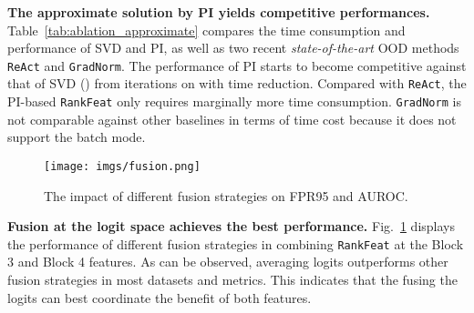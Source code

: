 \noindent \textbf{The approximate solution by PI yields competitive performances.} Table~\ref{tab:ablation_approximate} compares the time consumption and performance of SVD and PI, as well as two recent \emph{state-of-the-art} OOD methods \texttt{ReAct} and \texttt{GradNorm}. The performance of PI starts to become competitive against that of SVD () from  iterations on with  time reduction. Compared with \texttt{ReAct}, the PI-based \texttt{RankFeat} only requires marginally  more time consumption. \texttt{GradNorm} is not comparable against other baselines in terms of time cost because it does not support the batch mode.


\begin{figure}[htbp]
    \centering
    \texttt{[image: imgs/fusion.png]}
    \caption{The impact of different fusion strategies on FPR95 and AUROC.}
    \label{fig:fusion}
\end{figure}

\noindent \textbf{Fusion at the logit space achieves the best performance.} Fig.~\ref{fig:fusion} displays the performance of different fusion strategies in combining \texttt{RankFeat} at the Block 3 and Block 4 features. As can be observed, averaging logits outperforms other fusion strategies in most datasets and metrics. This indicates that the fusing the logits can best coordinate the benefit of both features.   































































